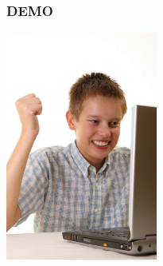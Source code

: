 \documentclass{beamer}
\begin{document}
    \begin{frame}[label=demo]
        \frametitle{DEMO}
        \begin{center}
            \includegraphics[width=5cm]{kid.eps}
        \end{center}
    \end{frame}
\end{document}
